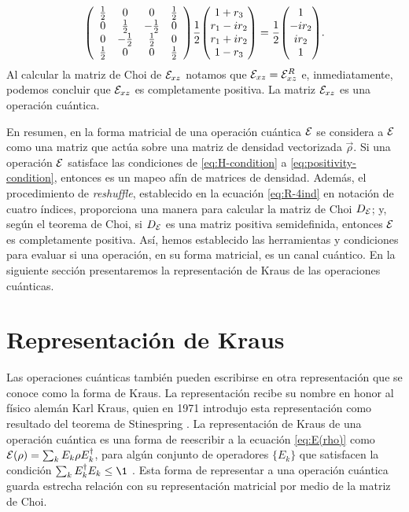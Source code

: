 \begin{align}
\mqty(
\begin{array}{cccc}
\frac{1}{2} & 0 & 0 & \frac{1}{2} \\
0 & \frac{1}{2} & -\frac{1}{2} & 0 \\
0 & -\frac{1}{2} & \frac{1}{2} & 0 \\
\frac{1}{2} & 0 & 0 & \frac{1}{2} \\
\end{array}
)
\frac{1}{2}
\mqty(
1+r_3\\r_1-ir_2\\r_1+ir_2\\1-r_3
)
=
\frac{1}{2}
\mqty(
1\\-ir_2\\ir_2\\1
).
\label{eq:QC-ex2-SR}
\end{align}
Al calcular la matriz de Choi de $\mathcal{E}_{xz}$ notamos 
que $\mathcal{E}_{xz}=\mathcal{E}_{xz}^R$ e, inmediatamente, podemos concluir
que $\mathcal{E}_{xz}$ es completamente positiva. La matriz $\mathcal{E}_{xz}$
es una operación cuántica.

En resumen, en la forma matricial de una operación cuántica $\mathcal{E}$
se considera a $\mathcal{E}$ como una matriz que actúa sobre 
una matriz de densidad vectorizada $\vec{\rho}$. 
Si una operación $\mathcal{E}$ satisface las condiciones de
\eqref{eq:H-condition} a \eqref{eq:positivity-condition}, entonces
es un mapeo afín de matrices de densidad.
Además, el procedimiento de \textit{reshuffle},
establecido en la ecuación \eqref{eq:R-4ind} en notación
de cuatro índices, proporciona una manera para 
calcular la matriz de Choi $D_{\mathcal{E}}$;
y, según el teorema de Choi, si 
$D_{\mathcal{E}}$ es una matriz positiva semidefinida, entonces $\mathcal{E}$ es 
completamente positiva. 
Así, hemos establecido las herramientas y condiciones para evaluar 
si una operación, en su forma matricial, es un canal cuántico.
En la siguiente sección presentaremos la representación de Kraus de las operaciones
cuánticas.
\section{Representación de Kraus} %

Las operaciones cuánticas también pueden escribirse
en otra representación que se conoce como la forma de Kraus.
La representación recibe su nombre en honor al físico alemán Karl Kraus,
quien en 1971 introdujo esta representación como resultado
del teorema de Stinespring \cite{bengtsson_zyczkowski_2017}.
La representación de Kraus de una operación cuántica es una forma
de reescribir a la ecuación \eqref{eq:E(rho)} como
$\mathcal{E}\qty(\rho)=\sum_k E_k\rho E_k^{\dagger}$,
para algún conjunto de operadores $\{E_k\}$ 
que satisfacen la condición $\sum _kE_k^{\dagger}E_k\leq\1$
\cite{nielsen_chuang_2011}. 
Esta forma de representar a una
operación cuántica guarda estrecha relación con 
su representación matricial por medio de la matriz de Choi. 

